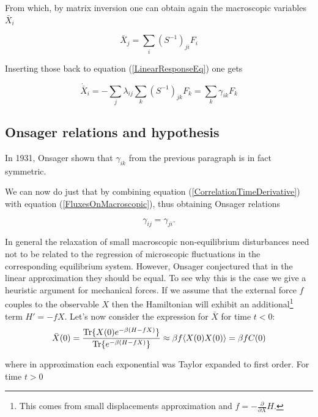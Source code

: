 \documentclass[a4paper,12pt]{article}
\begin{document}
From which, by matrix inversion one can obtain again the macroscopic variables $\bar{X}_i$

\begin{equation}
  \bar{X}_j = \sum_i (S^{-1})_{ji} F_i
\end{equation}


Inserting those back to equation (\ref{LinearResponseEq}) one gets

\begin{equation}
\label{FluxesOnMacroscopic}
  \dot{\bar{X}}_i=-\sum_j \lambda_{ij} \sum_k (S^{-1})_{jk} F_k = \sum_k \gamma_{ik} F_k
\end{equation}

\subsection{Onsager relations and hypothesis}

In 1931, Onsager\cite{Onsager:zgWBDrcO} shown  that $\gamma_{ik}$ from the previous paragraph is in fact symmetric.

We can now do just that by combining equation (\ref{CorrelationTimeDerivative}) with equation (\ref{FluxesOnMacroscopic}), thus obtaining Onsager relations

\begin{equation}
  \gamma_{ij}=\gamma_{ji}.
\end{equation}

In general the relaxation of small macroscopic non-equilibrium disturbances need not to be related to the regression of microscopic fluctuations in the corresponding equilibrium system. 
However, Onsager conjectured that in the linear approximation they should be equal. To see why this is the case we give a heuristic argument for mechanical forces.
If we assume that the external force $f$ couples to the observable $X$ then the Hamiltonian will exhibit an additional\footnote{This comes from small displacements approximation and $f=-\frac{\partial}{\partial{X}} H$.} term $H'=-f X$.
Let's now consider the expression for $\bar{X}$ for time $t < 0$:
\begin{equation}
  \bar{X}(0)=\frac{\Tr\{ X(0) e^{-\beta (H-f X)} \}}{\Tr\{ e^{-\beta (H-f X)} \}} \approx \beta f \langle X(0)X(0) \rangle= \beta f C(0)
\end{equation}

where in approximation each exponential was Taylor expanded to first order.
For time $t>0$
\end{document}

